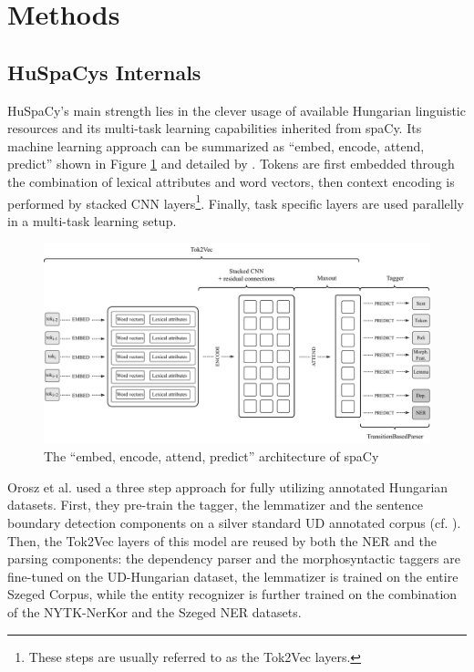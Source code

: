 \documentclass[runningheads,a4paper]{llncs}
\newcommand{\spacy}{spaCy}
\newcommand{\huspacy}{HuSpaCy}
\newcommand{\ud}{UD}
\newcommand{\udhu}{UD-Hungarian}
\newcommand{\szegedcorpus}{Szeged Corpus}
\newcommand{\nerkor}{NYTK-NerKor}
\newcommand{\szegedner}{Szeged NER}
\begin{document}
\section{Methods} \label{sec:methods}
\subsection{\huspacy\textquotesingle s Internals} \label{sec:methods:internals}

\huspacy’s main strength lies in the clever usage of available Hungarian linguistic resources and its multi-task learning capabilities inherited from \spacy. Its machine learning approach can be summarized as ``embed, encode, attend, predict''
shown in Figure \ref{fig:architecture} and detailed by \cite{spacy-parser,huspacy:2021}. Tokens are first embedded through the combination of lexical attributes and word vectors, then context encoding is performed by stacked CNN \cite{cnn} layers\footnote{These steps are usually referred to as the Tok2Vec layers.}. Finally, task specific layers are used parallelly in a multi-task learning setup.

\begin{figure}[h]
\centering
\includegraphics[width=\textwidth]{architecture_1.pdf}
\caption{The ``embed, encode, attend, predict'' architecture of \spacy}
\label{fig:architecture}
\end{figure}

Orosz et al. \cite{huspacy:2021} used a three step approach for fully utilizing annotated Hungarian datasets. First, they pre-train the tagger, the lemmatizer and the sentence boundary detection components on a silver standard \ud{} annotated corpus (cf. \cite{vincze-etal-2017-universal}). Then, the Tok2Vec layers of this model are reused by both the NER and the parsing components: the dependency parser and the morphosyntactic taggers are fine-tuned on the \udhu{} dataset, the lemmatizer is trained on the entire \szegedcorpus, while the entity recognizer is further trained on the combination of the \nerkor{} and the \szegedner{} datasets.
\end{document}
